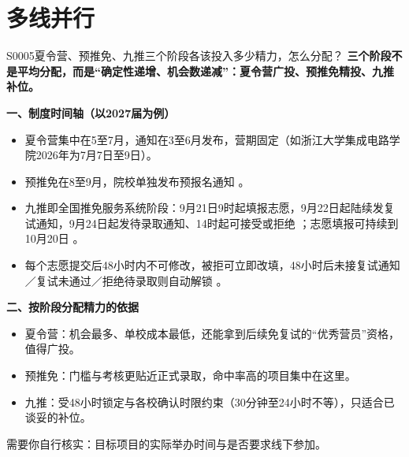 \section{多线并行}
\begin{qa}{S0005}{夏令营、预推免、九推三个阶段各该投入多少精力，怎么分配？}
\textbf{三个阶段不是平均分配，而是“确定性递增、机会数递减”：夏令营广投、预推免精投、九推补位。}

\textbf{一、制度时间轴（以2027届为例）}
\begin{itemize}
  \item 夏令营集中在5至7月，通知在3至6月发布，营期固定（如浙江大学集成电路学院2026年为7月7日至9日）。
  \item 预推免在8至9月，院校单独发布预报名通知 。
  \item 九推即全国推免服务系统阶段：9月21日9时起填报志愿，9月22日起陆续发复试通知，9月24日起发待录取通知、14时起可接受或拒绝 ；志愿填报可持续到10月20日 。
  \item 每个志愿提交后48小时内不可修改，被拒可立即改填，48小时后未接复试通知／复试未通过／拒绝待录取则自动解锁 。
\end{itemize}

\textbf{二、按阶段分配精力的依据}
\begin{itemize}
  \item 夏令营：机会最多、单校成本最低，还能拿到后续免复试的“优秀营员”资格，值得广投。
  \item 预推免：门槛与考核更贴近正式录取，命中率高的项目集中在这里。
  \item 九推：受48小时锁定与各校确认时限约束（30分钟至24小时不等），只适合已谈妥的补位。
\end{itemize}

需要你自行核实：目标项目的实际举办时间与是否要求线下参加。
\end{qa}

